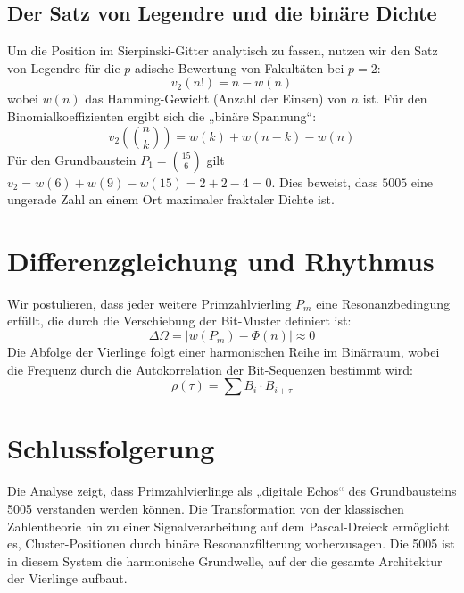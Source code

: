 \documentclass[11pt,a4paper]{article}
\begin{document}
	\subsection{Der Satz von Legendre und die binäre Dichte}
	Um die Position im Sierpinski-Gitter analytisch zu fassen, nutzen wir den Satz von Legendre für die $p$-adische Bewertung von Fakultäten bei $p=2$:
	$$v_2(n!) = n - w(n)$$
	wobei $w(n)$ das Hamming-Gewicht (Anzahl der Einsen) von $n$ ist. Für den Binomialkoeffizienten ergibt sich die „binäre Spannung“:
	$$v_2\left(\binom{n}{k}\right) = w(k) + w(n-k) - w(n)$$
	Für den Grundbaustein $P_1 = \binom{15}{6}$ gilt $v_2 = w(6) + w(9) - w(15) = 2 + 2 - 4 = 0$. Dies beweist, dass $5005$ eine ungerade Zahl an einem Ort maximaler fraktaler Dichte ist.
	
	\section{Differenzgleichung und Rhythmus}
	Wir postulieren, dass jeder weitere Primzahlvierling $P_m$ eine Resonanzbedingung erfüllt, die durch die Verschiebung der Bit-Muster definiert ist:
	$$\Delta \Omega = | w(P_m) - \Phi(n) | \approx 0$$
	Die Abfolge der Vierlinge folgt einer harmonischen Reihe im Binärraum, wobei die Frequenz durch die Autokorrelation der Bit-Sequenzen bestimmt wird:
	$$\rho(\tau) = \sum B_i \cdot B_{i+\tau}$$
	
	\section{Schlussfolgerung}
	Die Analyse zeigt, dass Primzahlvierlinge als „digitale Echos“ des Grundbausteins 5005 verstanden werden können. Die Transformation von der klassischen Zahlentheorie hin zu einer Signalverarbeitung auf dem Pascal-Dreieck ermöglicht es, Cluster-Positionen durch binäre Resonanzfilterung vorherzusagen. Die 5005 ist in diesem System die harmonische Grundwelle, auf der die gesamte Architektur der Vierlinge aufbaut.
	
\end{document}
